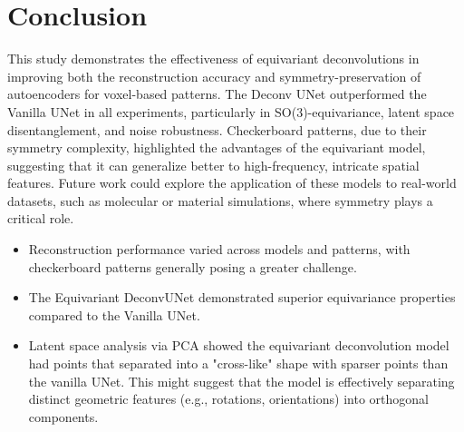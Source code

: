 \documentclass[letterpaper]{article}
\begin{document}
\section{Conclusion}
This study demonstrates the effectiveness of equivariant deconvolutions in improving both the reconstruction accuracy and symmetry-preservation of autoencoders for voxel-based patterns. The Deconv UNet outperformed the Vanilla UNet in all experiments, particularly in SO(3)-equivariance, latent space disentanglement, and noise robustness. Checkerboard patterns, due to their symmetry complexity, highlighted the advantages of the equivariant model, suggesting that it can generalize better to high-frequency, intricate spatial features. Future work could explore the application of these models to real-world datasets, such as molecular or material simulations, where symmetry plays a critical role.

\begin{itemize}
    \item Reconstruction performance varied across models and patterns, with checkerboard patterns generally posing a greater challenge.
    \item The Equivariant DeconvUNet demonstrated superior equivariance properties compared to the Vanilla UNet.
    \item Latent space analysis via PCA showed the equivariant deconvolution model had points that separated into a "cross-like" shape with sparser points than the vanilla UNet. This might suggest that the model is effectively separating distinct geometric features (e.g., rotations, orientations) into orthogonal components.
\end{itemize}


\printbibliography
\end{document}

